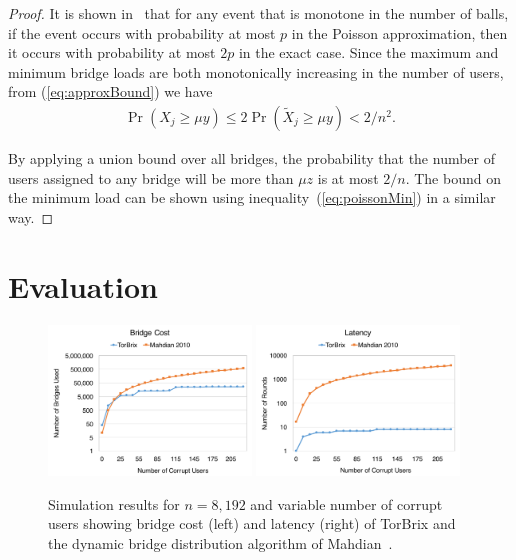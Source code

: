 \documentclass{llncs}
\begin{document}
\begin{proof}
	It is shown in~\cite[Corollary 5.11]{Michael2005} that for any event that is monotone in the number of balls, if the event occurs with probability at most $p$ in the Poisson approximation, then it occurs with probability at most $2p$ in the exact case. Since the maximum and minimum bridge loads are both monotonically increasing in the number of users, from (\ref{eq:approxBound}) we have
	\begin{align*}
	\Pr(X_j \geq \mu y) \leq 2\Pr(\tilde{X}_j \geq \mu y) < 2/n^2.
	\end{align*}
	
	By applying a union bound over all bridges, the probability that the number of users assigned to any bridge will be more than $\mu z$ is at most $2/n$. The bound on the minimum load can be shown using inequality~(\ref{eq:poissonMin}) in a similar way.
\end{proof}


\section{Evaluation} \label{sec:simulations}

\begin{figure}[t]
	\hspace{-0.4em}
	\includegraphics[width=0.48\textwidth]{bridgeCost}	
	\hspace{1em}
	\includegraphics[width=0.48\textwidth]{latency}	
	\hspace{0.3em}
	\caption{Simulation results for ${n=8,192}$ and variable number of corrupt users showing bridge cost (left) and latency (right) of TorBrix and the dynamic bridge distribution algorithm of Mahdian~\cite{Mahdian:2010}.}
	\label{fig:plot1} 
\end{figure}
\end{document}
